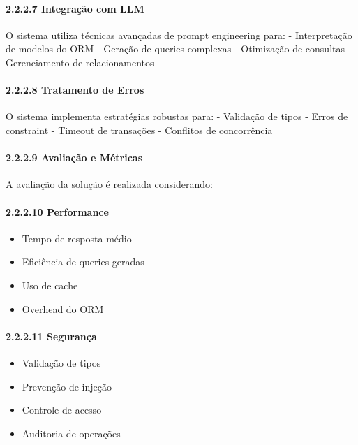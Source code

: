\documentclass[
]{article}
\providecommand{\tightlist}{%
  \setlength{\itemsep}{0pt}\setlength{\parskip}{0pt}}
\begin{document}
\paragraph{2.2.2.7 Integração com LLM}\label{integrauxe7uxe3o-com-llm}

O sistema utiliza técnicas avançadas de prompt engineering para: -
Interpretação de modelos do ORM - Geração de queries complexas -
Otimização de consultas - Gerenciamento de relacionamentos

\paragraph{2.2.2.8 Tratamento de Erros}\label{tratamento-de-erros}

O sistema implementa estratégias robustas para: - Validação de tipos -
Erros de constraint - Timeout de transações - Conflitos de concorrência

\paragraph{2.2.2.9 Avaliação e
Métricas}\label{avaliauxe7uxe3o-e-muxe9tricas}

A avaliação da solução é realizada considerando:

\paragraph{2.2.2.10 Performance}\label{performance}

\begin{itemize}
\tightlist
\item
  Tempo de resposta médio
\item
  Eficiência de queries geradas
\item
  Uso de cache
\item
  Overhead do ORM
\end{itemize}

\paragraph{2.2.2.11 Segurança}\label{seguranuxe7a}

\begin{itemize}
\tightlist
\item
  Validação de tipos
\item
  Prevenção de injeção
\item
  Controle de acesso
\item
  Auditoria de operações
\end{itemize}
\end{document}
